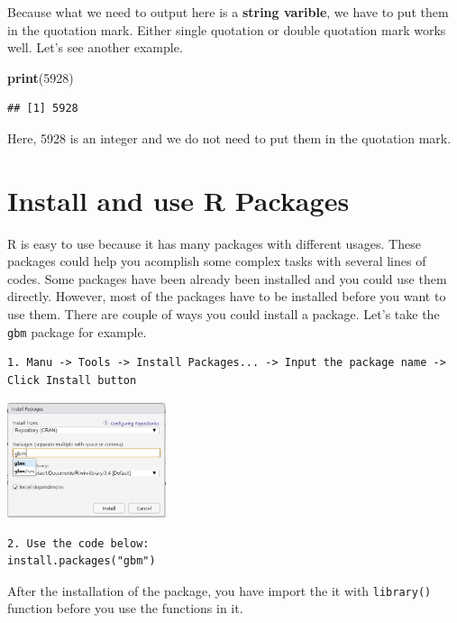 \documentclass[]{book}
\newenvironment{Shaded}{\begin{snugshade}}{\end{snugshade}}
\newcommand{\DecValTok}[1]{\textcolor[rgb]{0.00,0.00,0.81}{#1}}
\newcommand{\KeywordTok}[1]{\textcolor[rgb]{0.13,0.29,0.53}{\textbf{#1}}}
\newcommand{\NormalTok}[1]{#1}
\begin{document}
Because what we need to output here is a \textbf{string varible}, we have to put them in the quotation mark. Either single quotation or double quotation mark works well. Let's see another example.

\begin{Shaded}
\begin{Highlighting}[]
\KeywordTok{print}\NormalTok{(}\DecValTok{5928}\NormalTok{)}
\end{Highlighting}
\end{Shaded}

\begin{verbatim}
## [1] 5928
\end{verbatim}

Here, 5928 is an integer and we do not need to put them in the quotation mark.

\hypertarget{install-and-use-r-packages}{%
\section{Install and use R Packages}\label{install-and-use-r-packages}}

R is easy to use because it has many packages with different usages. These packages could help you acomplish some complex tasks with several lines of codes.
Some packages have been already been installed and you could use them directly. However, most of the packages have to be installed before you want to use them. There are couple of ways you could install a package. Let's take the \texttt{gbm} package for example.

\begin{verbatim}
1. Manu -> Tools -> Install Packages... -> Input the package name -> Click Install button
\end{verbatim}

\includegraphics[width=0.35\textwidth,height=\textheight]{Pics/InstallPackages.JPG}

\begin{verbatim}
2. Use the code below:
install.packages("gbm")
\end{verbatim}

After the installation of the package, you have import the it with \texttt{library()} function before you use the functions in it.
\end{document}
